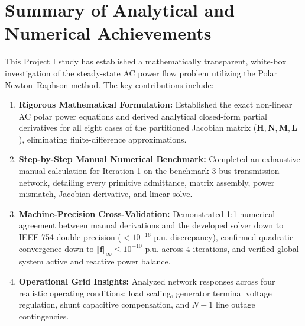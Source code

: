 \documentclass[12pt,a4paper,oneside]{report}
\begin{document}
\section{Summary of Analytical and Numerical Achievements}
This Project I study has established a mathematically transparent, white-box investigation of the steady-state AC power flow problem utilizing the Polar Newton--Raphson method. The key contributions include:
\begin{enumerate}
    \item \textbf{Rigorous Mathematical Formulation:} Established the exact non-linear AC polar power equations and derived analytical closed-form partial derivatives for all eight cases of the partitioned Jacobian matrix ($\mathbf{H}, \mathbf{N}, \mathbf{M}, \mathbf{L}$), eliminating finite-difference approximations.
    \item \textbf{Step-by-Step Manual Numerical Benchmark:} Completed an exhaustive manual calculation for Iteration 1 on the benchmark 3-bus transmission network, detailing every primitive admittance, matrix assembly, power mismatch, Jacobian derivative, and linear solve.
    \item \textbf{Machine-Precision Cross-Validation:} Demonstrated 1:1 numerical agreement between manual derivations and the developed solver down to IEEE-754 double precision ($< 10^{-16}\text{ p.u.}$ discrepancy), confirmed quadratic convergence down to $\Vert \mathbf{f} \Vert_\infty \le 10^{-10}\text{ p.u.}$ across 4 iterations, and verified global system active and reactive power balance.
    \item \textbf{Operational Grid Insights:} Analyzed network responses across four realistic operating conditions: load scaling, generator terminal voltage regulation, shunt capacitive compensation, and $N-1$ line outage contingencies.
\end{enumerate}
\end{document}
